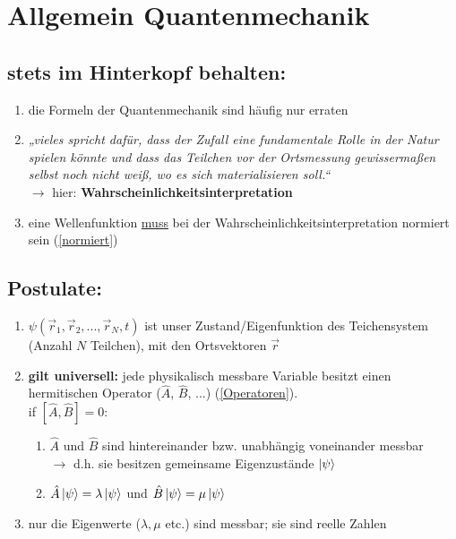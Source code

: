 \pagestyle{headings}

\section{Allgemein Quantenmechanik}

\subsection{stets im Hinterkopf behalten:}
\begin{enumerate}
\item die Formeln der Quantenmechanik sind häufig nur erraten
\item \textit{„vieles spricht dafür, dass der Zufall eine fundamentale Rolle in der Natur spielen könnte und dass 
das Teilchen vor der Ortsmessung gewissermaßen selbst noch nicht weiß, wo es sich materialisieren soll.“} \\
$\rightarrow$ hier: \textbf{Wahrscheinlichkeitsinterpretation}
\item eine Wellenfunktion \underline{muss} bei der Wahrscheinlichkeitsinterpretation normiert sein (\ref{normiert})
\end{enumerate}

\subsection{Postulate:}
\begin{enumerate}
\item $\psi(\vec{r}_1,\vec{r}_2, ...,\vec{r}_N,t)$ ist unser Zustand/Eigenfunktion des Teichensystem (Anzahl $N$ Teilchen), mit den Ortsvektoren $\vec{r}$
\item \textbf{gilt universell:} jede physikalisch messbare Variable besitzt einen hermitischen Operator ($\hat{A}$, $\hat{B}$, ...) (\ref{Operatoren}).\\
 if $[\hat{A},\hat{B}]=0$:
\begin{enumerate}
    \item $\hat{A}$ und $\hat{B}$ sind hintereinander bzw. unabhängig voneinander messbar \\
    $\rightarrow$ d.h. sie besitzen gemeinsame Eigenzustände $\ket{\psi}$
    \item $\hat{A}\ket{\psi}=\lambda\ket{\psi}$ und $\hat{B}\ket{\psi}=\mu\ket{\psi}$
\end{enumerate}
\item nur die Eigenwerte ($\lambda,\mu$ etc.) sind messbar; sie sind reelle Zahlen 

\end{enumerate}



